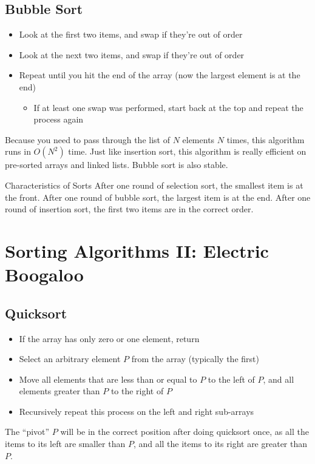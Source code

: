 \documentclass[class=article, crop=false]{standalone}
\begin{document}
  \subsection{Bubble Sort}
  \begin{itemize}
    \item Look at the first two items, and swap if they're out of order
    \item Look at the next two items, and swap if they're out of order
    \item Repeat until you hit the end of the array (now the largest element is at the end)
    \begin{itemize}
      \item If at least one swap was performed, start back at the top and repeat the process again
    \end{itemize}
  \end{itemize}
  Because you need to pass through the list of $N$ elements $N$ times, this algorithm runs in $O(N^2)$ time. Just like insertion sort, this algorithm is really efficient on pre-sorted arrays and linked lists. Bubble sort is also stable.
  \begin{note}{Characteristics of Sorts}
    After one round of selection sort, the smallest item is at the front. After one round of bubble sort, the largest item is at the end. After one round of insertion sort, the first two items are in the correct order.
  \end{note}
  \section{Sorting Algorithms II: Electric Boogaloo}
  \subsection{Quicksort}
  \begin{itemize}
    \item If the array has only zero or one element, return
    \item Select an arbitrary element $P$ from the array (typically the first)
    \item Move all elements that are less than or equal to $P$ to the left of $P$, and all elements greater than $P$ to the right of $P$ 
    \item Recursively repeat this process on the left and right sub-arrays
  \end{itemize}
  \begin{note}{}
    The ``pivot'' $P$ will be in the correct position after doing quicksort once, as all the items to its left are smaller than $P$, and all the items to its right are greater than $P$.
  \end{note}
\end{document}
